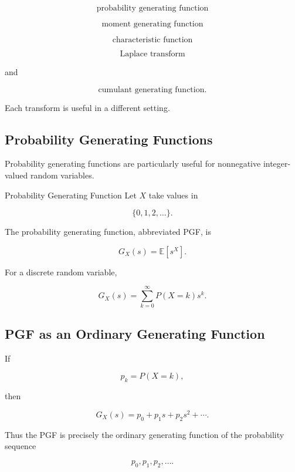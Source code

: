 \[
\boxed{
\text{probability generating function}
}
\]

\[
\boxed{
\text{moment generating function}
}
\]

\[
\boxed{
\text{characteristic function}
}
\]

\[
\boxed{
\text{Laplace transform}
}
\]

and

\[
\boxed{
\text{cumulant generating function}.
}
\]

Each transform is useful in a different setting.

\subsection{Probability Generating Functions}
\label{subsec:probability-generating-functions}

Probability generating functions are particularly useful for
nonnegative integer-valued random variables.

\begin{definitionbox}{Probability Generating Function}
Let \(X\) take values in

\[
\{0,1,2,\ldots\}.
\]

The probability generating function, abbreviated PGF, is

\[
\boxed{
G_X(s)
=
\mathbb{E}[s^X].
}
\]
\end{definitionbox}

For a discrete random variable,

\[
\boxed{
G_X(s)
=
\sum_{k=0}^{\infty}
P(X=k)s^k.
}
\]

\subsection{PGF as an Ordinary Generating Function}
\label{subsec:pgf-ordinary-generating-function}

If

\[
p_k=P(X=k),
\]

then

\[
G_X(s)
=
p_0+p_1s+p_2s^2+\cdots.
\]

Thus the PGF is precisely the ordinary generating function of the
probability sequence

\[
p_0,p_1,p_2,\ldots.
\]

